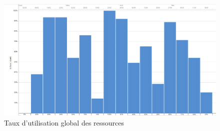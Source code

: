         \begin{landscape}
            \begin{figure}
                \centering
                \includegraphics[height=0.70\textwidth]{figure/TauxUtilisation.png}
                \caption{Taux d'utilisation global des ressources}
                \label{fig:taux_utilisation}
            \end{figure}
        \end{landscape}
